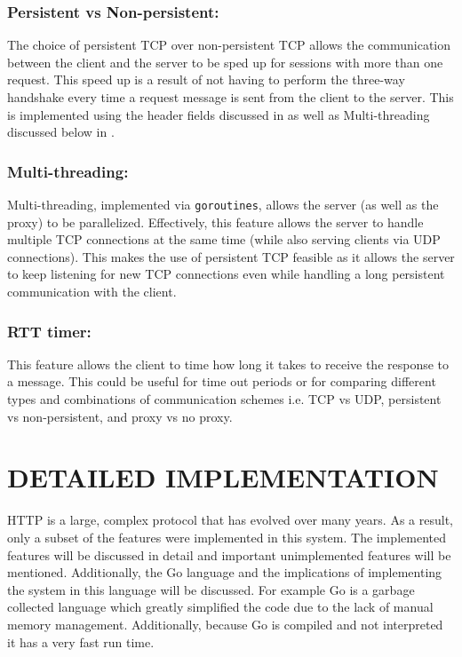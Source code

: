 \documentclass[10pt,twocolumn]{witseiepaper}
\begin{document}
	\subsubsection{Persistent vs Non-persistent:}

	The choice of persistent TCP over non-persistent TCP allows the communication between the client and the server to be sped up for sessions with more than one request. This speed up is a result of not having to perform the three-way handshake every time a request message is sent from the client to the server. This is implemented using the header fields discussed in  as well as Multi-threading discussed below in .

	\subsubsection{Multi-threading:} \label{thread}

	Multi-threading, implemented via \texttt{goroutines}, allows the server (as well as the proxy) to be parallelized. Effectively, this feature allows the server to handle multiple TCP connections at the same time (while also serving clients via UDP connections). This makes the use of persistent TCP feasible as it allows the server to keep listening for new TCP connections even while handling a long persistent communication with the client.

	\subsubsection{RTT timer:}

	This feature allows the client to time how long it takes to receive the response to a message. This could be useful for time out periods or for comparing different types and combinations of communication schemes i.e. TCP vs UDP, persistent vs non-persistent, and proxy vs no proxy.

\section{DETAILED IMPLEMENTATION}

HTTP is a large, complex protocol that has evolved over many years. As a result, only a subset of the features were implemented in this system. The implemented features will be discussed in detail and important unimplemented features will be mentioned. Additionally, the Go language and the implications of implementing the system in this language will be discussed. For example Go is a garbage collected language which greatly simplified the code due to the lack of manual memory management. Additionally, because Go is compiled and not interpreted it has a very fast run time.
\end{document}
